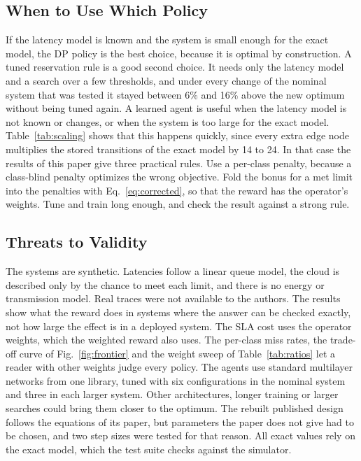 \documentclass[journal]{IEEEtran}
\begin{document}
\subsection{When to Use Which Policy}
If the latency model is known and the system is small enough for the exact model, the DP policy is the best choice, because it is optimal by construction. A tuned reservation rule is a good second choice. It needs only the latency model and a search over a few thresholds, and under every change of the nominal system that was tested it stayed between 6\% and 16\% above the new optimum without being tuned again. A learned agent is useful when the latency model is not known or changes, or when the system is too large for the exact model. Table~\ref{tab:scaling} shows that this happens quickly, since every extra edge node multiplies the stored transitions of the exact model by 14 to 24. In that case the results of this paper give three practical rules. Use a per-class penalty, because a class-blind penalty optimizes the wrong objective. Fold the bonus for a met limit into the penalties with Eq.~\eqref{eq:corrected}, so that the reward has the operator's weights. Tune and train long enough, and check the result against a strong rule.

\subsection{Threats to Validity}
The systems are synthetic. Latencies follow a linear queue model, the cloud is described only by the chance to meet each limit, and there is no energy or transmission model. Real traces were not available to the authors. The results show what the reward does in systems where the answer can be checked exactly, not how large the effect is in a deployed system. The SLA cost uses the operator weights, which the weighted reward also uses. The per-class miss rates, the trade-off curve of Fig.~\ref{fig:frontier} and the weight sweep of Table~\ref{tab:ratios} let a reader with other weights judge every policy. The agents use standard multilayer networks from one library, tuned with six configurations in the nominal system and three in each larger system. Other architectures, longer training or larger searches could bring them closer to the optimum. The rebuilt published design follows the equations of its paper, but parameters the paper does not give had to be chosen, and two step sizes were tested for that reason. All exact values rely on the exact model, which the test suite checks against the simulator.
\end{document}
